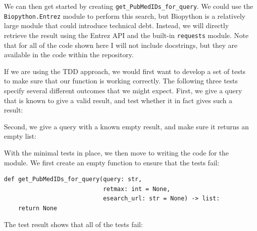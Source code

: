 We can then get started by creating \texttt{get\_PubMedIDs\_for\_query}.
We could use the \texttt{Biopython.Entrez} module to perform this search, but Biopython is a relatively large module that could introduce technical debt.
Instead, we will directly retrieve the result using the Entrez API and the built-in \texttt{requests} module.
Note that for all of the code shown here I will not include docstrings, but they are available in the code within the repository.

If we are using the TDD approach, we would first want to develop a set of tests to make sure that our function is working correctly.
The following three tests specify several different outcomes that we might expect.
First, we give a query that is known to give a valid result, and test whether it in fact gives such a result:



Second, we give a query with a known empty result, and make sure it returns an empty list:



With the minimal tests in place, we then move to writing the code for the module.
We first create an empty function to ensure that the tests fail:

\begin{lstlisting}[style=Pythonshort]
def get_PubMedIDs_for_query(query: str, 
                            retmax: int = None,
                            esearch_url: str = None) -> list:
    return None
\end{lstlisting}

The test result shows that all of the tests fail:

